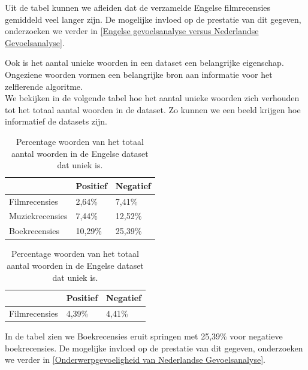 Uit de tabel kunnen we afleiden dat de verzamelde Engelse filmrecensies gemiddeld veel langer zijn. De mogelijke invloed op de prestatie van dit gegeven, onderzoeken we verder in \ref{Engelse gevoelsanalyse versus Nederlandse Gevoelsanalyse}.


Ook is het aantal unieke woorden in een dataset een belangrijke eigenschap. Ongeziene woorden vormen een belangrijke bron aan informatie voor het zelflerende algoritme.\\
We bekijken in de volgende tabel hoe het aantal unieke woorden zich verhouden tot het totaal aantal woorden in de dataset. Zo kunnen we een beeld krijgen hoe informatief de datasets zijn.
\begin{table}[h]
\centering
\setlength\tabcolsep{2pt}
\begin{minipage}[t]{0.48\textwidth}
\centering
\begin{tabular}{l|l|l|}
\cline{2-3}
                                      & Positief & Negatief \\ \hline
\multicolumn{1}{|l|}{Filmrecensies}   & 2,64\%   & 7,41\%   \\ \hline
\multicolumn{1}{|l|}{Muziekrecensies} & 7,44\%   & 12,52\%  \\ \hline
\multicolumn{1}{|l|}{Boekrecensies}   & 10,29\%  & 25,39\%  \\ \hline
\end{tabular}

\caption{Percentage woorden van het totaal aantal woorden in de Nederlandse dataset dat uniek is.} 
\label{percentage recensies}
\end{minipage}%
\hfill
\begin{minipage}[t]{0.48\textwidth}
\centering
\begin{tabular}{l|l|l|}
\cline{2-3}
                                    & Positief & Negatief \\ \hline
\multicolumn{1}{|l|}{Filmrecensies} & 4,39\%   & 4,41\%   \\ \hline
\end{tabular}
\caption{Percentage woorden van het totaal aantal woorden in de Engelse dataset dat uniek is.} 
\end{minipage}
\end{table}

In de tabel zien we Boekrecensies eruit springen met 25,39\% voor negatieve boekrecensies. De mogelijke invloed op de prestatie van dit gegeven, onderzoeken we verder in \ref{Onderwerpgevoeligheid van Nederlandse Gevoelsanalyse}.\\

